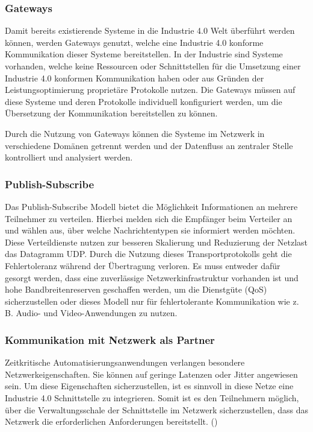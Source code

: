 \subsubsection{Gateways}
Damit bereits existierende Systeme in die Industrie 4.0 Welt überführt werden können, werden Gateways genutzt, welche eine Industrie 4.0 konforme Kommunikation dieser Systeme bereitstellen. In der Industrie sind Systeme vorhanden, welche keine Ressourcen oder Schnittstellen für die Umsetzung einer Industrie 4.0 konformen Kommunikation haben oder aus Gründen der Leistungsoptimierung proprietäre Protokolle nutzen. Die Gateways müssen auf diese Systeme und deren Protokolle individuell konfiguriert werden, um die Übersetzung der Kommunikation bereitstellen zu können.

Durch die Nutzung von Gateways können die Systeme im Netzwerk in verschiedene Domänen getrennt werden und der Datenfluss an zentraler Stelle kontrolliert und analysiert werden.

\subsubsection{Publish-Subscribe}
\label{Grundlagen:Publish-Subscribe}
Das Publish-Subscribe Modell bietet die Möglichkeit Informationen an mehrere Teilnehmer zu verteilen. Hierbei melden sich die Empfänger beim Verteiler an und wählen aus, über welche Nachrichtentypen sie informiert werden möchten. Diese Verteildienste nutzen zur besseren Skalierung und Reduzierung der Netzlast das Datagramm \ac{UDP}. Durch die Nutzung dieses Transportprotokolls geht die Fehlertoleranz während der Übertragung verloren. Es muss entweder dafür gesorgt werden, dass eine zuverlässige Netzwerkinfrastruktur vorhanden ist und hohe Bandbreitenreserven geschaffen werden, um die Dienstgüte (\ac{QoS}) sicherzustellen oder dieses Modell nur für fehlertolerante Kommunikation wie z. B. Audio- und Video-Anwendungen zu nutzen.

\subsubsection{Kommunikation mit Netzwerk als Partner}
Zeitkritische Automatisierungsanwendungen verlangen besondere Netzwerkeigenschaften. Sie können auf geringe Latenzen oder Jitter angewiesen sein. Um diese Eigenschaften sicherzustellen, ist es sinnvoll in diese Netze eine Industrie 4.0 Schnittstelle zu integrieren. Somit ist es den Teilnehmern möglich, über die Verwaltungsschale der Schnittstelle im Netzwerk sicherzustellen, dass das Netzwerk die erforderlichen Anforderungen bereitstellt. (\cite{sichKom2017})

